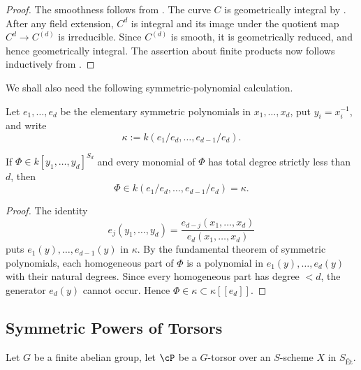 \begin{proof}
The smoothness follows from .
The curve $C$ is geometrically integral by . After any field
extension, $C^d$ is integral and its image under the quotient map
$C^d\to C^{(d)}$ is irreducible. Since $C^{(d)}$ is smooth, it is geometrically
reduced, and hence geometrically integral. The assertion about finite products
now follows inductively from .
\end{proof}

We shall also need the following symmetric-polynomial calculation.

Let $e_1,\dots,e_d$ be the elementary symmetric polynomials in
$x_1,\dots,x_d$, put $y_i=x_i^{-1}$, and write
\[
    \kappa:=k(e_1/e_d,\dots,e_{d-1}/e_d).
\]

\begin{lemma}
\label{lemma:symmetric_regularity}
If $\Phi\in k[y_1,\dots,y_d]^{S_d}$ and every monomial of $\Phi$ has total
degree strictly less than $d$, then
\[
    \Phi\in k(e_1/e_d,\dots,e_{d-1}/e_d)=\kappa.
\]
\end{lemma}

\begin{proof}
The identity
\[
    e_j(y_1,\dots,y_d)
       =\frac{e_{d-j}(x_1,\dots,x_d)}{e_d(x_1,\dots,x_d)}
\]
puts $e_1(y),\dots,e_{d-1}(y)$ in $\kappa$. By the fundamental theorem of
symmetric polynomials, each homogeneous part of $\Phi$ is a polynomial in
$e_1(y),\dots,e_d(y)$ with their natural degrees. Since every homogeneous
part has degree $<d$, the generator $e_d(y)$ cannot occur. Hence
$\Phi\in\kappa\subset\kappa[[e_d]]$.
\end{proof}


\subsection*{Symmetric Powers of Torsors}
Let $G$ be a finite abelian group, let $\cP$ be a $G$-torsor over an $S$-scheme $X$ in $S_{\text{Ét}}$. 


